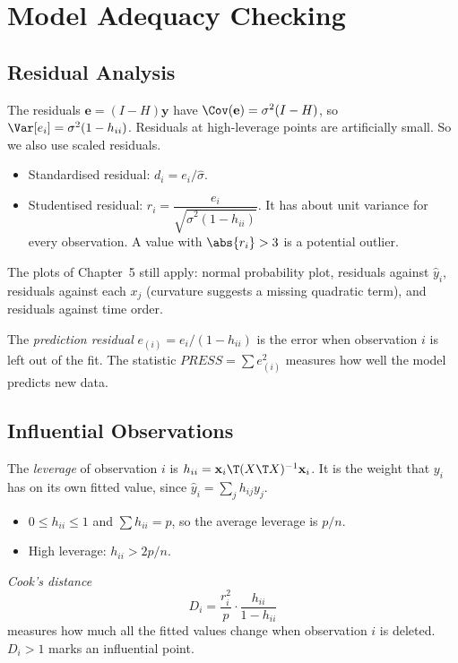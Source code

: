 \section{Model Adequacy Checking}\label{sec:madeq}

\subsection{Residual Analysis}

The residuals $\mathbf{e}=(I-H)\mathbf{y}$ have $\Cov(\mathbf{e})=\sigma^2(I-H)$, so $\Var[e_i]=\sigma^2(1-h_{ii})$. Residuals at high-leverage points are artificially small. So we also use scaled residuals.

\begin{definition}
\begin{itemize}
  \item Standardised residual: $d_i=e_i/\hat\sigma$.
  \item Studentised residual: $r_i=\dfrac{e_i}{\sqrt{\hat\sigma^2(1-h_{ii})}}$. It has about unit variance for every observation. A value with $\abs{r_i}>3$ is a potential outlier.
\end{itemize}
\end{definition}

The plots of Chapter~5 still apply: normal probability plot, residuals against $\hat{y}_i$, residuals against each $x_j$ (curvature suggests a missing quadratic term), and residuals against time order.

The \emph{prediction residual} $e_{(i)}=e_i/(1-h_{ii})$ is the error when observation $i$ is left out of the fit. The statistic $PRESS=\sum e_{(i)}^2$ measures how well the model predicts new data.

\subsection{Influential Observations}

\begin{definition}
The \emph{leverage} of observation $i$ is $h_{ii}=\mathbf{x}_i\T(X\T X)^{-1}\mathbf{x}_i$. It is the weight that $y_i$ has on its own fitted value, since $\hat{y}_i=\sum_jh_{ij}y_j$.
\begin{itemize}
  \item $0\le h_{ii}\le1$ and $\sum h_{ii}=p$, so the average leverage is $p/n$.
  \item High leverage: $h_{ii}>2p/n$.
\end{itemize}
\emph{Cook's distance}
\[ D_i=\frac{r_i^2}p\cdot\frac{h_{ii}}{1-h_{ii}} \]
measures how much all the fitted values change when observation $i$ is deleted. $D_i>1$ marks an influential point.
\end{definition}

